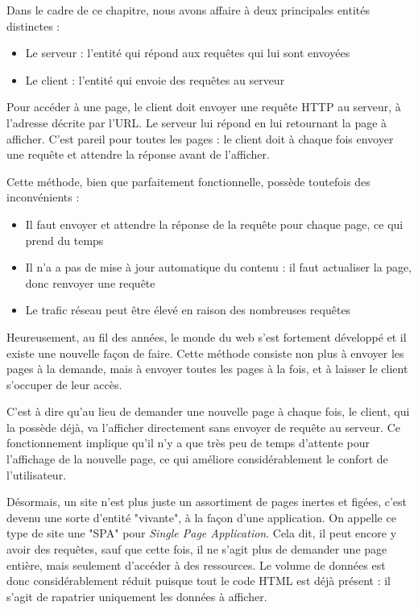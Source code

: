 \documentclass[
    iai, %
    eai, %
]{heig-tb}
\begin{document}
Dans le cadre de ce chapitre, nous avons affaire à deux principales entités distinctes :
\begin{itemize}
  \item Le serveur : l'entité qui répond aux requêtes qui lui sont envoyées
  \item Le client : l'entité qui envoie des requêtes au serveur
\end{itemize}
\bigskip

Pour accéder à une page, le client doit envoyer une requête HTTP au serveur, à l'adresse décrite par l'URL. Le serveur lui répond en lui retournant la page à afficher.
C'est pareil pour toutes les pages : le client doit à chaque fois envoyer une requête et attendre la réponse avant de l'afficher.


Cette méthode, bien que parfaitement fonctionnelle, possède toutefois des inconvénients :
\begin{itemize}
  \item Il faut envoyer et attendre la réponse de la requête pour chaque page, ce qui prend du temps
  \item Il n'a a pas de mise à jour automatique du contenu : il faut actualiser la page, donc renvoyer une requête
  \item Le trafic réseau peut être élevé en raison des nombreuses requêtes
\end{itemize}
\bigskip
Heureusement, au fil des années, le monde du web s'est fortement développé et il existe une nouvelle façon de faire.
Cette méthode consiste non plus à envoyer les pages à la demande, mais à envoyer toutes les pages à la fois, et à laisser le client s'occuper de leur accès.

\newpage
C'est à dire qu'au lieu de demander une nouvelle page à chaque fois, le client, qui la possède déjà, va l'afficher directement sans envoyer de requête au serveur.
Ce fonctionnement implique qu'il n'y a que très peu de temps d'attente pour l'affichage de la nouvelle page, ce qui améliore considérablement le confort de l'utilisateur.


Désormais, un site n'est plus juste un assortiment de pages inertes et figées, c'est devenu une sorte d'entité "vivante", à la façon d'une application.
On appelle ce type de site une "SPA" pour \emph{Single Page Application}.
Cela dit, il peut encore y avoir des requêtes, sauf que cette fois, il ne s'agit plus de demander une page entière, mais seulement d'accéder à des ressources.
Le volume de données est donc considérablement réduit puisque tout le code HTML est déjà présent : il s'agit de rapatrier uniquement les données à afficher.
\end{document}
